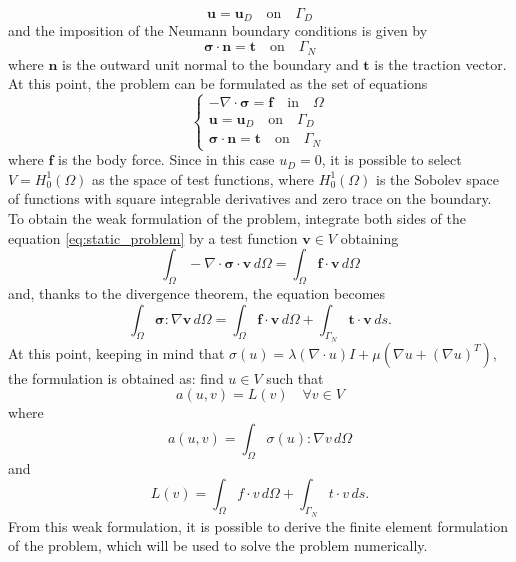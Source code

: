 \begin{equation}
    \bm{u} = \bm{u}_D \quad \text{on} \quad \Gamma_D
\end{equation}
and the imposition of the Neumann boundary conditions is given by
\begin{equation}
    \bm{\sigma} \cdot \bm{n} = \bm{t} \quad \text{on} \quad \Gamma_N
\end{equation}
where \( \bm{n} \) is the outward unit normal to the boundary and \( \bm{t} \) is the traction vector. 
At this point, the problem can be formulated as the set of equations
\begin{equation}
    \begin{cases}
        -\nabla \cdot \bm{\sigma} = \bm{f} \quad \text{in} \quad \Omega \\
        \bm{u} = \bm{u}_D \quad \text{on} \quad \Gamma_D \\
        \bm{\sigma} \cdot \bm{n} = \bm{t} \quad \text{on} \quad \Gamma_N
    \end{cases}
\label{eq:static_problem}
\end{equation}
where \( \bm{f} \) is the body force. 
Since in this case \(u_D = 0\), it is possible to select \(V = H^1_0(\Omega)\) as the space of test functions, where \(H^1_0(\Omega)\) is the Sobolev space of functions with square integrable derivatives and zero trace on the boundary. To obtain the weak formulation of the problem, integrate both sides of the equation \eqref{eq:static_problem} by a test function \( \bm{v} \in V \) obtaining 
\begin{equation}
    \int_{\Omega} -\nabla \cdot \bm{\sigma} \cdot \bm{v} \, d\Omega = \int_{\Omega} \bm{f} \cdot \bm{v} \, d\Omega
\end{equation}
and, thanks to the divergence theorem, the equation becomes
\begin{equation}
    \int_{\Omega} \bm{\sigma} : \nabla \bm{v} \, d\Omega = \int_{\Omega} \bm{f} \cdot \bm{v} \, d\Omega + \int_{\Gamma_N} \bm{t} \cdot \bm{v} \, ds.
\end{equation}
At this point, keeping in mind that \(\sigma(u) = \lambda(\nabla \cdot u)I + \mu (\nabla u + (\nabla u)^T)\), the formulation is obtained as: find \(u \in V\) such that
\begin{equation}
    a(u,v) = L(v) \quad \forall v \in V
\end{equation}
where
\begin{equation}
    a(u,v) = \int_{\Omega} \sigma(u) : \nabla v \, d\Omega
\end{equation}
and
\begin{equation}
    L(v) = \int_{\Omega} f \cdot v \, d\Omega + \int_{\Gamma_N} t \cdot v \, ds.
\end{equation}
From this weak formulation, it is possible to derive the finite element formulation of the problem, which will be used to solve the problem numerically.

